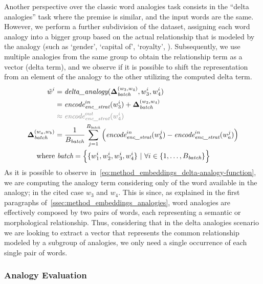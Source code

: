 Another perspective over the classic word analogies task consists in the ``delta analogies'' task where the premise is similar, and the input words are the same.
However, we perform a further subdivision of the dataset, assigning each word analogy into a bigger group based on the actual relationship that is modeled by the analogy (such as `gender', `capital of', `royalty', ).
Subsequently, we use multiple analogies from the same group to obtain the relationship term as a vector (delta term), and we observe if it is possible to shift the representation from an element of the analogy to the other utilizing the computed delta term.
\begin{equation}
    \label{eq:method_embeddings_delta-analogy-function}
    \begin{aligned}
        \tilde{w}^i &= \textit{delta\_analogy}(\gbm{\Delta}_{\textit{batch}}^{(w_3, w_4)}, w_3^i, w_4^i) \\
        &= {\textit{encode}}_{\textit{enc\_strat}}^{in}(w_3^i) + \gbm{\Delta}_{\textit{batch}}^{(w_3, w_4)} \\
        &\color{gray} \approx {\textit{encode}}_{\textit{enc\_strat}}^{out}(w_4^i) \\
        \gbm{\Delta}_{\textit{batch}}^{(w_a, w_b)} &= \frac{1}{B_{\textit{batch}}}\sum_{j=1}^{B_{\textit{batch}}}{\Bigl({\textit{encode}}_{\textit{enc\_strat}}^{in}(w_b^j) - {\textit{encode}}_{\textit{enc\_strat}}^{in}(w_a^j)\Bigr)} \\
        \text{where}&\ \textit{batch} = \Bigl\{ \{w_1^i, w_2^i, w_3^i, w_4^i\} \ |\ \forall i \in \{1,\ldots, B_{\textit{batch}}\} \Bigr\}
    \end{aligned}
\end{equation}
As it is possible to observe in~\cref{eq:method_embeddings_delta-analogy-function}, we are computing the analogy term considering only  of the word available in the analogy; in the cited case $w_3$ and $w_4$.
This is  since, as explained in the first paragraphs of~\cref{ssec:method_embeddings_analogies}, word analogies are effectively composed by two pairs of words, each representing a semantic or morphological relationship.
Thus, considering that in the delta analogies scenario we are looking to extract a vector that represents the common relationship modeled by a subgroup of analogies, we only need a single occurrence of each single pair of words.


\subsubsection{Analogy Evaluation}\label{subsubsec:method_embeddings_evaluation}

